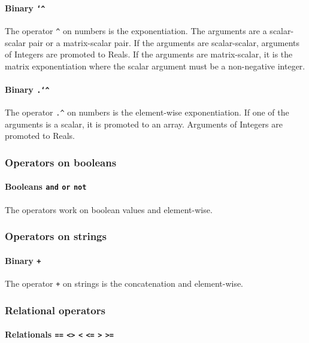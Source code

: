 \documentclass[10pt,b5paper]{article}
\begin{document}
\paragraph{Binary {\tt{}\char`\^}}

The operator \verb'^' on numbers is the exponentiation.  The arguments
are a scalar-scalar pair or a matrix-scalar pair.  If the arguments
are scalar-scalar, arguments of Integers are promoted to Reals.  If
the arguments are matrix-scalar, it is the matrix exponentiation where
the scalar argument must be a non-negative integer.

\paragraph{Binary {\tt{}.\char`\^}}

The operator \verb'.^' on numbers is the element-wise exponentiation.
If one of the arguments is a scalar, it is promoted to an array.
Arguments of Integers are promoted to Reals.

\subsubsection*{Operators on booleans}

\paragraph{Booleans {\tt{}and} {\tt{}or} {\tt{}not}}

The operators work on boolean values and element-wise.

\subsubsection*{Operators on strings}

\paragraph{Binary {\tt{}+}}

The operator \verb'+' on strings is the concatenation and
element-wise.

\subsubsection*{Relational operators}\label{sec:relational-operators}

\paragraph{Relationals {\tt{}==} {\tt{}<>} {\tt{}<} {\tt{}<=} {\tt{}>}
{\tt{}>=}}
\end{document}
